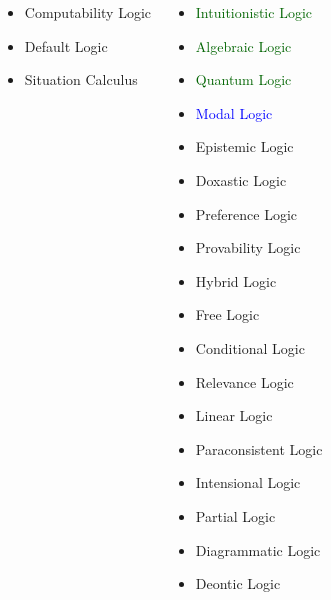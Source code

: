 \documentclass[aspectratio=43,11pt,UTF8,colorlinks,compress]{beamer} %
\begin{document}
{{\begin{minipage}{13cm}
\begin{columns}
\begin{itemize}
						\item Computability Logic
						\item Default Logic
						\item Situation Calculus
					\end{itemize}
					\begin{itemize}
						\item \textcolor{darkgreen}{Intuitionistic Logic}
						\item \textcolor{darkgreen}{Algebraic Logic}
						\item \textcolor{darkgreen}{Quantum Logic}
						\item \textcolor{blue}{Modal Logic}
						\item Epistemic Logic
						\item Doxastic Logic
						\item Preference Logic
						\item Provability Logic
						\item Hybrid Logic
						\item Free Logic
						\item Conditional Logic
						\item Relevance Logic
						\item Linear Logic
						\item Paraconsistent Logic
						\item Intensional Logic
						\item Partial Logic
						\item Diagrammatic Logic
						\item Deontic Logic
					\end{itemize}
			\end{columns}
	\end{minipage}}
}
\end{document}
